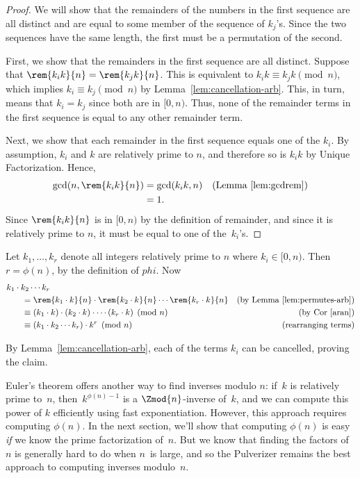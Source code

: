 \begin{proof}
We will show that the remainders of the numbers in the first sequence
are all distinct and are equal to some member of the sequence of
$k_j$'s.  Since the two sequences have the same length, the first must
be a permutation of the second.

First, we show that the remainders in the first sequence are all
distinct.  Suppose that $\rem{k_i k}{n} = \rem{k_j k}{n}$.  This is
equivalent to $k_i k \equiv k_j k \pmod{n}$, which implies $k_i \equiv
k_j \pmod{n}$ by Lemma~\ref{lem:cancellation-arb}.  This, in turn,
means that $k_i = k_j$ since both are in $[0,n)$.  Thus, none
of the remainder terms in the first sequence is equal to any other
remainder term.

Next, we show that each remainder in the first sequence equals one of
the $k_i$.  By assumption, $k_i$ and $k$ are relatively prime to $n$,
and therefore so is $k_ik$ by Unique Factorization.  Hence,
\begin{align*}
\gcd(n, \rem{k_i k}{n}) & = \gcd(k_i k, n)
            & \text{(Lemma~\ref{lem:gcdrem})}\\
      & = 1.
\end{align*}
Since $\rem{k_i k}{n}$ is in $[0, n)$ by the definition of remainder,
  and since it is relatively prime to $n$, it must be equal to one of
  the~$k_i$'s.
\end{proof}

Let $k_1, \dots, k_r$ denote all integers relatively prime to $n$
where $ k_i\in [0, n)$.  Then $r = \phi(n)$, by the definition of
  $phi$.  Now
\begin{align*}
\lefteqn{k_1 \cdot k_2 \cdots k_r} \hspace{0.25in} \\
  & = \rem{k_1 \cdot k}{n} \cdot \rem{k_2 \cdot k}{n} \cdots \rem{k_r \cdot k}{n}
      & \text{(by Lemma~\ref{lem:permutes-arb})}\\
  & \equiv (k_1 \cdot k) \cdot (k_2 \cdot k) \cdot \cdots (k_r \cdot k) \pmod{n}
      & \text{(by Cor~\ref{aran})}\\
  & \equiv (k_1 \cdot k_2 \cdots k_r) \cdot k^r \pmod{n}
      & \text{(rearranging terms)}
\end{align*}

By Lemma~\ref{lem:cancellation-arb}, each of the terms $k_i$ can be
cancelled, proving the claim.
\fi

\medskip
Euler's theorem offers another way to find inverses modulo
$n$: if~$k$ is relatively prime to~$n$, then~$k^{\phi(n)-1}$ is a
$\Zmod{n}$-inverse of~$k$, and we can compute this power of $k$
efficiently using fast exponentiation.  However, this approach
requires computing $\phi(n)$.  In the next section, we'll show that
computing $\phi(n)$ is easy \emph{if} we know the prime factorization
of~$n$.  But we know that finding the factors of~$n$ is generally hard
to do when $n$~is large, and so the Pulverizer remains the best
approach to computing inverses modulo~$n$.

